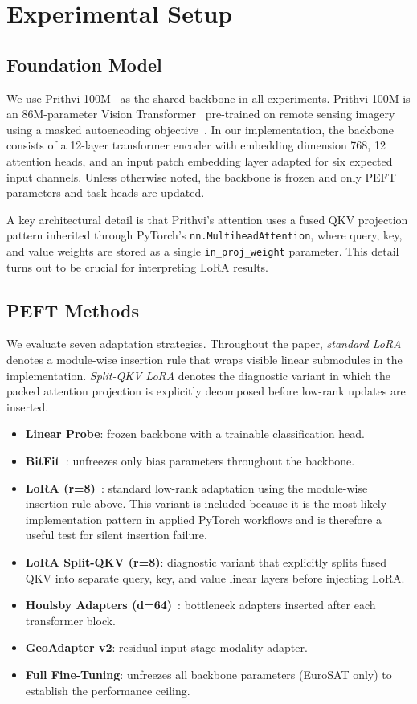 \section{Experimental Setup}

\subsection{Foundation Model}
We use Prithvi-100M~\cite{jakubik2023prithvi} as the shared backbone in all experiments. Prithvi-100M is an 86M-parameter Vision Transformer~\cite{dosovitskiy2021vit} pre-trained on remote sensing imagery using a masked autoencoding objective~\cite{he2022mae}. In our implementation, the backbone consists of a 12-layer transformer encoder with embedding dimension 768, 12 attention heads, and an input patch embedding layer adapted for six expected input channels. Unless otherwise noted, the backbone is frozen and only PEFT parameters and task heads are updated.

A key architectural detail is that Prithvi's attention uses a fused QKV projection pattern inherited through PyTorch's \texttt{nn.MultiheadAttention}, where query, key, and value weights are stored as a single \texttt{in\_proj\_weight} parameter. This detail turns out to be crucial for interpreting LoRA results.

\subsection{PEFT Methods}
We evaluate seven adaptation strategies. Throughout the paper, \emph{standard LoRA} denotes a module-wise insertion rule that wraps visible linear submodules in the implementation. \emph{Split-QKV LoRA} denotes the diagnostic variant in which the packed attention projection is explicitly decomposed before low-rank updates are inserted.
\begin{itemize}[leftmargin=1.5em]
    \item \textbf{Linear Probe}: frozen backbone with a trainable classification head.
    \item \textbf{BitFit}~\cite{zaken2022bitfit}: unfreezes only bias parameters throughout the backbone.
    \item \textbf{LoRA (r=8)}~\cite{hu2022lora}: standard low-rank adaptation using the module-wise insertion rule above. This variant is included because it is the most likely implementation pattern in applied PyTorch workflows and is therefore a useful test for silent insertion failure.
    \item \textbf{LoRA Split-QKV (r=8)}: diagnostic variant that explicitly splits fused QKV into separate query, key, and value linear layers before injecting LoRA.
    \item \textbf{Houlsby Adapters (d=64)}~\cite{houlsby2019adapter}: bottleneck adapters inserted after each transformer block.
    \item \textbf{GeoAdapter v2}: residual input-stage modality adapter.
    \item \textbf{Full Fine-Tuning}: unfreezes all backbone parameters (EuroSAT only) to establish the performance ceiling.
\end{itemize}

